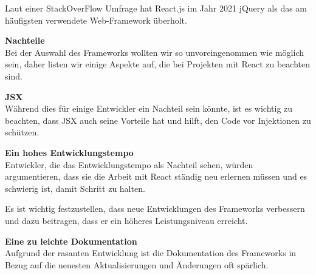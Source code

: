 Laut einer StackOverFlow Umfrage hat React.js im Jahr 2021 jQuery als das am häufigsten verwendete Web-Framework überholt.
\newline

\textbf{Nachteile}\\
Bei der Auswahl des Frameworks wollten wir so unvoreingenommen wie möglich sein, daher listen wir einige Aspekte auf, die bei Projekten mit React zu beachten sind.
\newline

\textbf{JSX}\\
Während dies für einige Entwickler ein Nachteil sein könnte, ist es wichtig zu beachten, dass JSX auch seine Vorteile hat und hilft, den Code vor Injektionen zu schützen.
\newline

\textbf{Ein hohes Entwicklungstempo}\\
Entwickler, die das Entwicklungstempo als Nachteil sehen, würden argumentieren, dass sie die Arbeit mit React ständig neu erlernen müssen und es schwierig ist, damit Schritt zu halten.

Es ist wichtig festzustellen, dass neue Entwicklungen des Frameworks verbessern und dazu beitragen, dass er ein höheres Leistungsniveau erreicht. 
\newline

\textbf{Eine zu leichte Dokumentation}\\
Aufgrund der rasanten Entwicklung ist die Dokumentation des Frameworks in Bezug auf die neuesten Aktualisierungen und Änderungen oft spärlich. 

